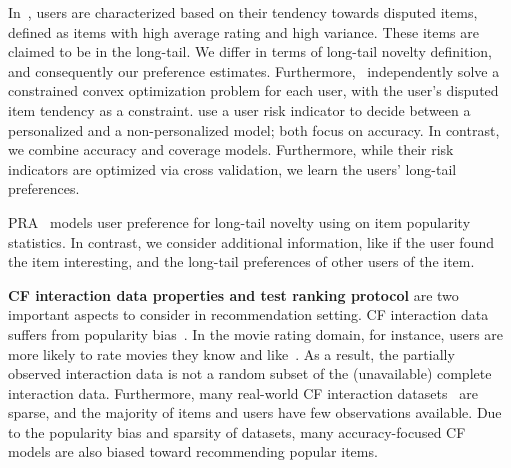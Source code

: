 In~\cite{jambor2010optimizing},  users are  characterized  based on their tendency towards disputed items, defined as items with  high average rating and high variance. These items  are claimed to  be in the long-tail. We differ in terms of long-tail novelty definition, and consequently our preference estimates.  \iffullpaper Furthermore,~\cite{jambor2010optimizing}  independently solve a constrained convex optimization problem for each user, with the user's disputed item tendency as a constraint. \fi \cite{zhang2013personalize,wang2009portfolio} use a user risk indicator to decide  between a personalized  and a non-personalized model; both focus on accuracy. In contrast, we combine accuracy and coverage models. Furthermore, while their risk indicators are optimized via cross validation, we learn the users' long-tail preferences.

PRA~\cite{jugovac2017efficient}   models user  preference for  long-tail novelty using on  item popularity statistics. In contrast,  we consider  additional information, like if the user found the item interesting,  and the long-tail preferences of other users  of the item.

\vspace{2mm}
\noindent \textbf{CF interaction data properties and test ranking protocol } %
are two important aspects to consider in recommendation setting. CF interaction data suffers from  popularity bias~\cite{agarwal_chen_2016}.  In the movie rating domain, for instance, users are more likely to rate movies they know and like~\cite{cremonesi2010performance,steck2011item,steck2013evaluation,agarwal_chen_2016,steck2010training}. As a result, the partially observed interaction data is  not a  random subset of the (unavailable) complete interaction data. %
Furthermore, many real-world CF interaction datasets~\cite{dooms2013movietweetings,kanagal2012supercharging,liu2017experimental,zolaktaf2015learn} are sparse, and the majority of  items and users  have few observations available. Due to  the popularity bias and sparsity of datasets,  many accuracy-focused  CF models are also biased toward recommending popular items. 
  
